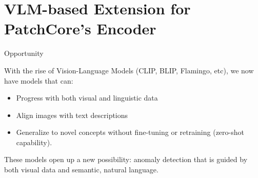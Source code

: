\section{VLM-based Extension for PatchCore's Encoder}
\begin{frame}{Opportunity}
\begin{block}{}
    With the rise of Vision-Language Models (CLIP, BLIP, Flamingo, etc), we now have models that can:
    \begin{itemize}
        \item Progress with both visual and linguistic data
        \item Align images with text descriptions
        \item Generalize to novel concepts without fine-tuning or retraining (zero-shot capability).
    \end{itemize}
These models open up a new possibility: anomaly detection that is guided by both visual data and semantic, natural language.
\end{block}
\end{frame}

